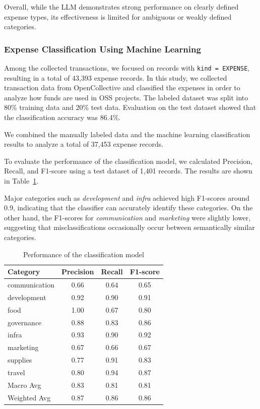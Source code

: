 \documentclass[11pt]{ist-thesis-lt}
\begin{document}
Overall, while the LLM demonstrates strong performance on clearly defined expense types, its effectiveness is limited for ambiguous or weakly defined categories.

\subsubsection{Expense Classification Using Machine Learning}

Among the collected transactions, we focused on records with \texttt{kind = EXPENSE}, resulting in a total of 43,393 expense records.
In this study, we collected transaction data from OpenCollective and classified the expenses in order to analyze how funds are used in OSS projects.
The labeled dataset was split into 80\% training data and 20\% test data.
Evaluation on the test dataset showed that the classification accuracy was 86.4\%.

We combined the manually labeled data and the machine learning classification results to analyze a total of 37,453 expense records.

To evaluate the performance of the classification model, we calculated Precision, Recall, and F1-score using a test dataset of 1,401 records.
The results are shown in Table~\ref{tab:classification-performance}.

Major categories such as \textit{development} and \textit{infra} achieved high F1-scores around 0.9, indicating that the classifier can accurately identify these categories.
On the other hand, the F1-scores for \textit{communication} and \textit{marketing} were slightly lower, suggesting that misclassifications occasionally occur between semantically similar categories.

\begin{table}[htbp]
\centering
\caption{Performance of the classification model}\label{tab:classification-performance}
\begin{tabular}{lccc}
\toprule
Category & Precision & Recall & F1-score \\
\midrule
communication & 0.66 & 0.64 & 0.65 \\
development & 0.92 & 0.90 & 0.91 \\
food & 1.00 & 0.67 & 0.80 \\
governance & 0.88 & 0.83 & 0.86 \\
infra & 0.93 & 0.90 & 0.92 \\
marketing & 0.67 & 0.66 & 0.67 \\
supplies & 0.77 & 0.91 & 0.83 \\
travel & 0.80 & 0.94 & 0.87 \\
\midrule
Macro Avg & 0.83 & 0.81 & 0.81 \\
Weighted Avg & 0.87 & 0.86 & 0.86 \\
\bottomrule
\end{tabular}
\end{table}
\end{document}
